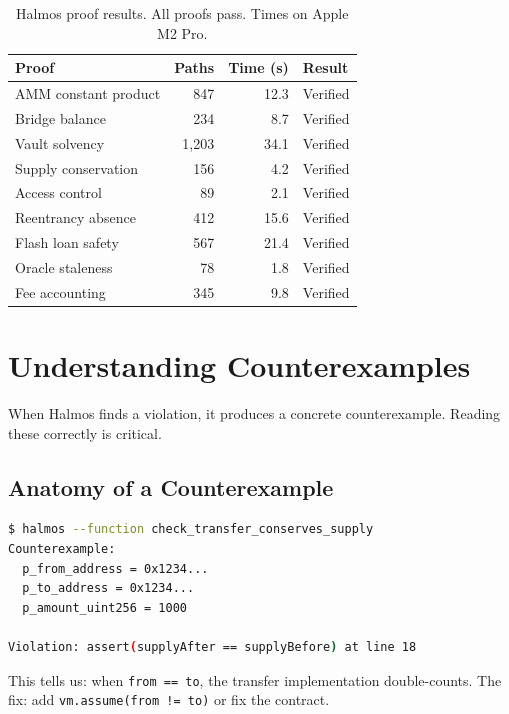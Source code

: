 \documentclass[11pt,a4paper]{article}
\begin{document}
\begin{table}[H]
\centering
\small
\begin{tabular}{@{}lrrl@{}}
\toprule
\textbf{Proof} & \textbf{Paths} & \textbf{Time (s)} & \textbf{Result} \\
\midrule
AMM constant product & 847 & 12.3 & Verified \\
Bridge balance & 234 & 8.7 & Verified \\
Vault solvency & 1,203 & 34.1 & Verified \\
Supply conservation & 156 & 4.2 & Verified \\
Access control & 89 & 2.1 & Verified \\
Reentrancy absence & 412 & 15.6 & Verified \\
Flash loan safety & 567 & 21.4 & Verified \\
Oracle staleness & 78 & 1.8 & Verified \\
Fee accounting & 345 & 9.8 & Verified \\
\bottomrule
\end{tabular}
\caption{Halmos proof results. All proofs pass. Times on Apple M2 Pro.}
\end{table}

\section{Understanding Counterexamples}

When Halmos finds a violation, it produces a concrete counterexample. Reading these
correctly is critical.

\subsection{Anatomy of a Counterexample}

\begin{lstlisting}[language=bash,caption={Halmos counterexample output}]
$ halmos --function check_transfer_conserves_supply
Counterexample:
  p_from_address = 0x1234...
  p_to_address = 0x1234...
  p_amount_uint256 = 1000

Violation: assert(supplyAfter == supplyBefore) at line 18
\end{lstlisting}

This tells us: when \texttt{from == to}, the transfer implementation double-counts.
The fix: add \texttt{vm.assume(from != to)} or fix the contract.
\end{document}

